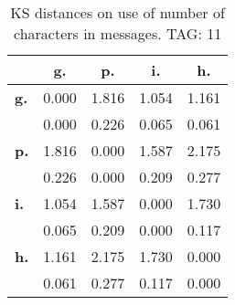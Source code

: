 \begin{table}[h!]
\begin{center}
\begin{tabular}{| l || c | c | c | c |}\hline
 & {\bf g.} & {\bf p.} & {\bf i.} & {\bf h.} \\\hline\hline
{\bf g.} & 0.000 & 1.816 & 1.054 & 1.161 \\
{\bf } & 0.000 & 0.226 & 0.065 & 0.061 \\\hline
{\bf p.} & 1.816 & 0.000 & 1.587 & 2.175 \\
{\bf } & 0.226 & 0.000 & 0.209 & 0.277 \\\hline
{\bf i.} & 1.054 & 1.587 & 0.000 & 1.730 \\
{\bf } & 0.065 & 0.209 & 0.000 & 0.117 \\\hline
{\bf h.} & 1.161 & 2.175 & 1.730 & 0.000 \\
{\bf } & 0.061 & 0.277 & 0.117 & 0.000 \\\hline
\end{tabular}
\caption{KS distances on use of number of characters in messages. TAG: 11}
\end{center}
\end{table}